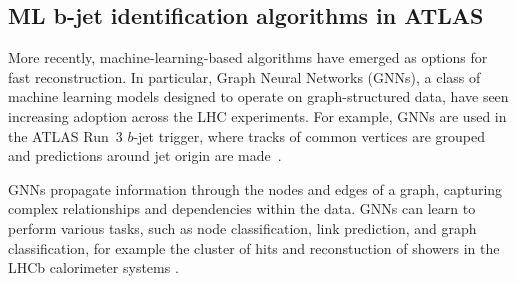 
\subsection{ML b-jet identification algorithms in ATLAS} \label{sec:Algorithms}

More recently, machine-learning-based algorithms have emerged as options for fast reconstruction. In particular, Graph Neural Networks (GNNs), a class of machine learning models designed to operate on graph-structured data, have seen increasing adoption across the LHC experiments. For example, GNNs are used in the ATLAS Run~3 $b$-jet trigger, where tracks of common vertices are grouped and predictions around jet origin are made~\cite{ATLASTriggerRun3}. 

GNNs propagate information through the nodes and edges of a graph, capturing complex relationships and dependencies within the data. GNNs can learn to perform various tasks, such as node classification, link prediction, and graph classification, for example the cluster of hits and reconstuction of showers in the LHCb calorimeter systems \cite{canudas2022graph}.

